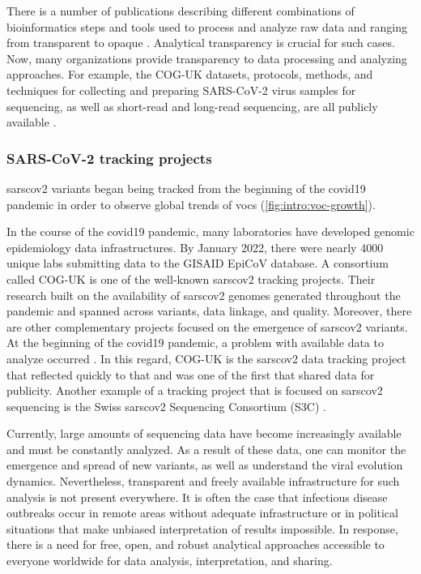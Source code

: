         There is a number of publications describing different combinations of bioinformatics steps and tools used to process and analyze raw data \cite{baker2020} and ranging from transparent to opaque \cite{holshue2020}. Analytical transparency is crucial for such cases. Now, many organizations provide transparency to data processing and analyzing approaches. For example, the COG-UK datasets, protocols, methods, and techniques for collecting and preparing SARS-CoV-2 virus samples for sequencing, as well as short-read and long-read sequencing, are all publicly available \cite{quick2020}.
        
        \subsubsection{SARS-CoV-2 tracking projects} \label{sec:intro:clinical-surveillance}
        
        \acrshort{sarscov2} variants began being tracked from the beginning of the \acrshort{covid19} pandemic in order to observe global trends of \acrfull{vocs} (\cref{fig:intro:voc-growth}).
     
        In the course of the \acrshort{covid19} pandemic, many laboratories have developed genomic epidemiology data infrastructures. By January 2022, there were nearly 4000 unique labs submitting data to the GISAID EpiCoV database. A consortium called COG-UK \cite{cogconsortium} is one of the well-known \acrshort{sarscov2} tracking projects. Their research built on the availability of \acrshort{sarscov2} genomes generated throughout the pandemic and spanned across variants, data linkage, and quality. Moreover, there are other complementary projects focused on the emergence of \acrshort{sarscov2} variants. At the beginning of the \acrshort{covid19} pandemic, a problem with available data to analyze occurred \cite{baker2020}. In this regard, COG-UK is the \acrshort{sarscov2} data tracking project that reflected quickly to that and was one of the first that shared data for publicity. Another example of a tracking project that is focused on \acrshort{sarscov2} sequencing is the Swiss \acrshort{sarscov2} Sequencing Consortium (S3C) \cite{chen2022,swiss}.
        
        Currently, large amounts of sequencing data have become increasingly available and must be constantly analyzed. As a result of these data, one can monitor the emergence and spread of new variants, as well as understand the viral evolution dynamics. Nevertheless, transparent and freely available infrastructure for such analysis is not present everywhere. It is often the case that infectious disease outbreaks occur in remote areas without adequate infrastructure or in political situations that make unbiased interpretation of results impossible. In response, there is a need for free, open, and robust analytical approaches accessible to everyone worldwide for data analysis, interpretation, and sharing.

